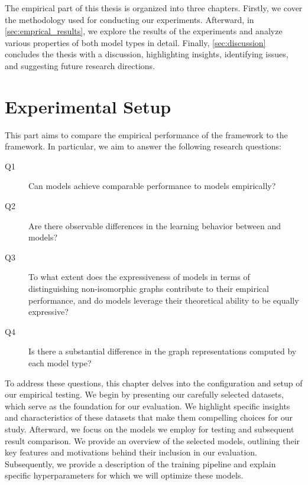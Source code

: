 \cleardoubleoddstandardpage

The empirical part of this thesis is organized into three chapters. Firstly, we cover the methodology used for conducting our experiments. Afterward, in \cref{sec:emprical_results}, we explore the results of the experiments and analyze various properties of both model types in detail. Finally, \cref{sec:discussion} concludes the thesis with a discussion, highlighting insights, identifying issues, and suggesting future research directions.

{\let\clearpage\relax
\chapter{Experimental Setup}\label{sec:testing_configuration}}
This part aims to compare the empirical performance of the \wlnn framework to the \gnn framework. In particular, we aim to answer the following research questions:
\begin{description}
	\item[Q1] Can \wlnn models achieve comparable performance to \gnn models empirically?

	\item[Q2] Are there observable differences in the learning behavior between \wlnn and \gnn models?

	\item[Q3] To what extent does the expressiveness of \wlnn models in terms of distinguishing non-isomorphic graphs contribute to their empirical performance, and do \gnn models leverage their theoretical ability to be equally expressive?
	
	\item[Q4] Is there a substantial difference in the graph representations computed by each model type?
\end{description}
To address these questions, this chapter delves into the configuration and setup of our empirical testing. We begin by presenting our carefully selected datasets, which serve as the foundation for our evaluation. We highlight specific insights and characteristics of these datasets that make them compelling choices for our study. Afterward, we focus on the models we employ for testing and subsequent result comparison. We provide an overview of the selected models, outlining their key features and motivations behind their inclusion in our evaluation. Subsequently, we provide a description of the training pipeline and explain specific hyperparameters for which we will optimize these models.


